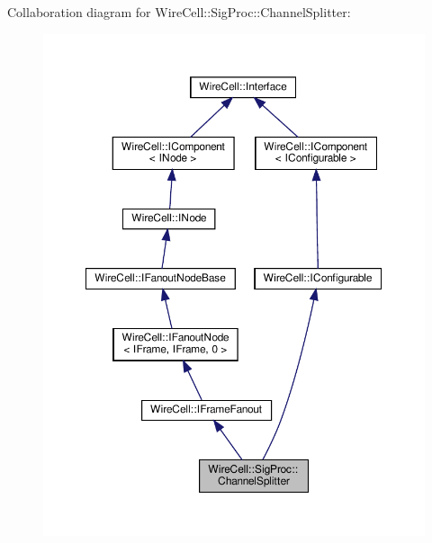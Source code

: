 Collaboration diagram for Wire\+Cell\+:\+:Sig\+Proc\+:\+:Channel\+Splitter\+:
\nopagebreak
\begin{figure}[H]
\begin{center}
\leavevmode
\includegraphics[width=350pt]{class_wire_cell_1_1_sig_proc_1_1_channel_splitter__coll__graph}
\end{center}
\end{figure}
